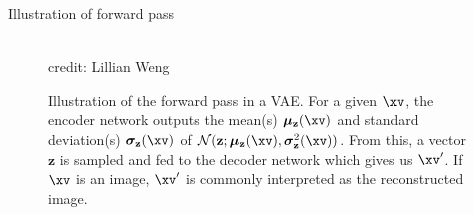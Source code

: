 \begin{frame}{Illustration of forward pass}
  \begin{figure}
    \centering
    \tiny{\\ credit: Lillian Weng}
    \caption{\footnotesize Illustration of the forward pass in a VAE. For a given $\xv$, the encoder network outputs the mean(s) $\bm{\mu}_{\mathbf{z}}(\xv)$ and standard deviation(s) $\bm{\sigma}_{\mathbf{z}}(\xv)$ of $\mathcal{N}(\mathbf{z}; \bm{\mu}_{\mathbf{z}}(\xv), \bm{\sigma}^2_{\mathbf{z}}(\xv))$. From this, a vector $\mathbf{z}$ is sampled and fed to the decoder network which gives us $\xv'$. If $\xv$ is an image, $\xv'$ is commonly interpreted as the reconstructed image. }
    \end{figure}
\end{frame}

